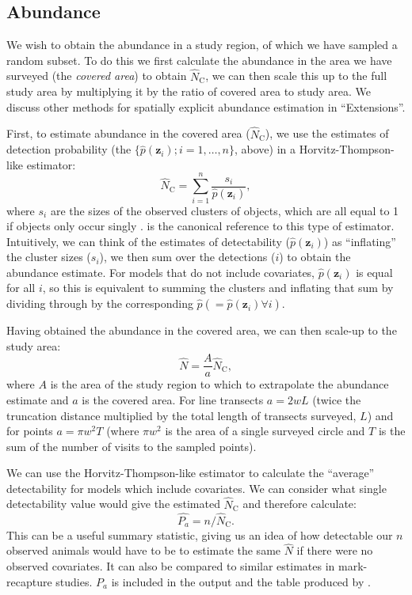 \documentclass[article]{jss}
\begin{document}
\subsection{Abundance}

We wish to obtain the abundance in a study region, of which we have sampled a random subset. To do this we first calculate the abundance in the area we have surveyed (the \textit{covered area}) to obtain $\hat{N}_\text{C}$, we can then scale this up to the full study area by multiplying it by the ratio of covered area to study area. We discuss other methods for spatially explicit abundance estimation in ``Extensions''.

First, to estimate abundance in the covered area ($\hat{N}_\text{C}$), we use the estimates of detection probability (the $\{\hat{p}(\mathbf{z}_i); i=1,\ldots,n\}$, above) in a Horvitz-Thompson-like estimator:
\begin{equation}
\hat{N}_\text{C} = \sum_{i=1}^n\frac{s_i}{\hat{p}(\mathbf{z}_i)},
\label{ht}
\end{equation}
where $s_i$ are the sizes of the observed clusters of objects, which are all equal to 1 if objects only occur singly \citep{Borchers:2004wr}. \cite{thompson2012sampling} is the canonical reference to this type of estimator. Intuitively, we can think of the estimates of detectability ($\hat{p}(\mathbf{z}_i)$) as ``inflating'' the cluster sizes ($s_i$), we then sum over the detections ($i$) to obtain the abundance estimate. For models that do not include covariates, $\hat{p}(\mathbf{z}_i)$ is equal for all $i$, so this is equivalent to summing the clusters and inflating that sum by dividing through by the corresponding $\hat{p} (=\hat{p}(\mathbf{z}_i) \forall i)$.

Having obtained the abundance in the covered area, we can then scale-up to the study area:
$$
\hat{N} = \frac{A}{a} \hat{N}_\text{C},
$$
where $A$ is the area of the study region to which to extrapolate the abundance estimate and $a$ is the covered area. For line transects $a=2wL$ (twice the truncation distance multiplied by the total length of transects surveyed, $L$) and for points $a=\pi w^2 T$ (where $\pi w^2$ is the area of a single surveyed circle and $T$ is the sum of the number of visits to the sampled points).

We can use the Horvitz-Thompson-like estimator to calculate the ``average'' detectability for models which include covariates. We can consider what single detectability value would give the estimated $\hat{N}_\text{C}$ and therefore calculate:
$$
\hat{P_a} = n/\hat{N}_\text{C}.
$$
This can be a useful summary statistic, giving us an idea of how detectable our $n$ observed animals would have to be to estimate the same $\hat{N}$ if there were no observed covariates. It can also be compared to similar estimates in mark-recapture studies. $P_a$ is included in the  output and the table produced by . 
\end{document}
